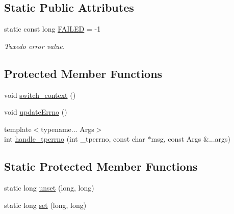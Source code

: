 \subsection*{Static Public Attributes}
\begin{DoxyCompactItemize}
\item 
\hypertarget{classatmi_1_1tuxedo_a79d8805a077e30138729f44c75fcfa5d}{static const long \hyperlink{classatmi_1_1tuxedo_a79d8805a077e30138729f44c75fcfa5d}{F\+A\+I\+L\+E\+D} = -\/1}\label{classatmi_1_1tuxedo_a79d8805a077e30138729f44c75fcfa5d}

\begin{DoxyCompactList}\small\item\em Tuxedo error value. \end{DoxyCompactList}\end{DoxyCompactItemize}
\subsection*{Protected Member Functions}
\begin{DoxyCompactItemize}
\item 
void \hyperlink{classatmi_1_1tuxedo_a90d83b2141d484744a82202f3f66a939}{switch\+\_\+context} ()
\item 
void \hyperlink{classatmi_1_1tuxedo_a1c1d7f2df43e4357788d03977548ac2e}{update\+Errno} ()
\item 
{\footnotesize template$<$typename... Args$>$ }\\int \hyperlink{classatmi_1_1tuxedo_ae8715aedf9c8f3178aec71e93ee35be4}{handle\+\_\+tperrno} (int \+\_\+tperrno, const char $\ast$msg, const Args \&...args)
\end{DoxyCompactItemize}
\subsection*{Static Protected Member Functions}
\begin{DoxyCompactItemize}
\item 
static long \hyperlink{classatmi_1_1tuxedo_abe17cfd8c79b1bc47fce4cbadc87d12f}{unset} (long, long)
\item 
static long \hyperlink{classatmi_1_1tuxedo_a73c4c95f165a052ba5a3a29cb2834831}{set} (long, long)
\end{DoxyCompactItemize}
